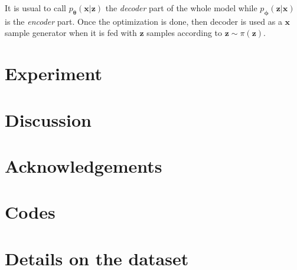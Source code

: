\documentclass[11pt]{amsart}
\begin{document}
It is usual to call $p_{\bm{\theta}}(\bm{x}|\bm{z})$ the \textit{decoder} part of the whole model while $p_{\bm{\phi}}(\bm{z}|\bm{x})$ is the \textit{encoder} part. Once the optimization is done, then decoder is used as a $\bm{x}$ sample generator when it is fed with $\bm{z}$ samples according to $\bm{z}\sim\pi(\bm{z})$.



%
\section{Experiment}



\section{Discussion}


\section*{Acknowledgements}

\section*{Codes}


\appendix
\section{Details on the dataset}
\end{document}
